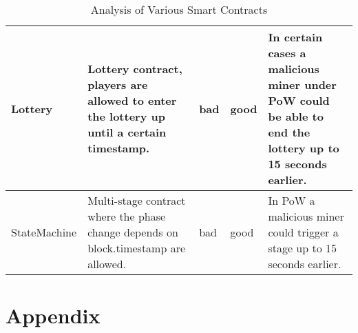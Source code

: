 \begin{table}[H]
\begin{tabularx}{\textwidth}{L{3.5cm}L{3.5cm}C{0.5cm}C{0.5cm}X}
    Lottery                & Lottery contract, players are allowed to enter the lottery up until a certain timestamp.                                                & bad          & good         & In certain cases a malicious miner under PoW could be able to end the lottery up to 15 seconds earlier.                                                                                       \\ \hline                  
    StateMachine           & Multi-stage contract where the phase change depends on block.timestamp are allowed.                                                     & bad          & good         & In PoW a malicious miner could trigger a stage up to 15 seconds earlier.                                                                                                                     \\ \hline
  \end{tabularx}
  \caption{Analysis of Various Smart Contracts}
  \label{tab:smart_contracts}
\end{table}


\newpage
\section{Appendix}
\label{appendix}











